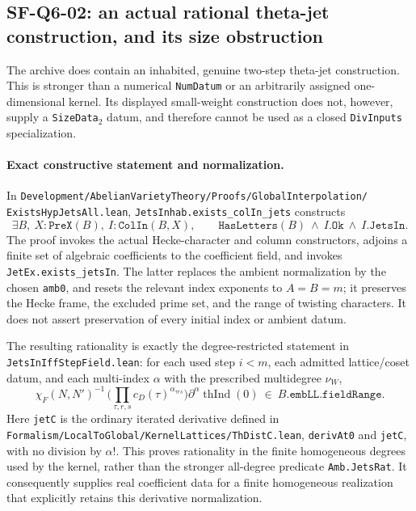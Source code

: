 \subsection{SF-Q6-02: an actual rational theta-jet construction, and its size obstruction}

The archive does contain an inhabited, genuine two-step theta-jet
construction.  This is stronger than a numerical \texttt{NumDatum} or
an arbitrarily assigned one-dimensional kernel.  Its displayed
small-weight construction does not, however, supply a
\texttt{SizeData$_2$} datum, and therefore cannot be used as a closed
\texttt{DivInputs} specialization.

\paragraph{Exact constructive statement and normalization.}
In
\texttt{Development/AbelianVarietyTheory/Proofs/GlobalInterpolation/
ExistsHypJetsAll.lean}, \texttt{JetsInhab.exists\_colIn\_jets}
constructs
\[
 \exists B,\ X:\texttt{PreX}(B),\ I:\texttt{ColIn}(B,X),\qquad
 \texttt{HasLetters}(B)\ \wedge\ I.\texttt{Ok}\ \wedge\ I.\texttt{JetsIn}.
\]
The proof invokes the actual Hecke-character and column constructors,
adjoins a finite set of algebraic coefficients to the coefficient field,
and invokes \texttt{JetEx.exists\_jetsIn}.  The latter replaces the
ambient normalization by the chosen \texttt{amb0}, and resets the
relevant index exponents to $A=B=m$; it preserves the Hecke frame,
the excluded prime set, and the range of twisting characters.  It
does not assert preservation of every initial index or ambient datum.

The resulting rationality is exactly the degree-restricted statement
in \texttt{JetsInIffStepField.lean}: for each used step $i<m$, each
admitted lattice/coset datum, and each multi-index $\alpha$ with
the prescribed multidegree $\nu_W$,
\[
 \chi_F(N,N')^{-1}\,
 \biggl(\prod_{\tau,r,s}c_D(\tau)^{\alpha_{\tau rs}}\biggr)
 \partial^\alpha\operatorname{thInd}(0)
 \ \in\ B.\texttt{embLL}.\texttt{fieldRange}.
\]
Here \texttt{jetC} is the ordinary iterated derivative defined in
\texttt{Formalism/LocalToGlobal/KernelLattices/ThDistC.lean},
\texttt{derivAt0} and \texttt{jetC}, with no division by
$\alpha!$.  This proves rationality in the finite homogeneous
degrees used by the kernel, rather than the stronger all-degree
predicate \texttt{Amb.JetsRat}.  It consequently supplies real
coefficient data for a finite homogeneous realization that explicitly
retains this derivative normalization.

